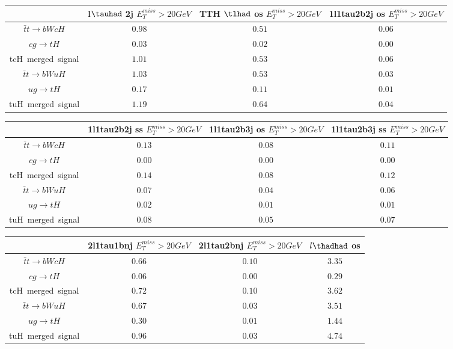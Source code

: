 \begin{tabular}{|c|c|c|c|} \hline
 & l$\tauhad$ 2j  $E_T^{miss}>20GeV$ & TTH $\tlhad$ os  $E_T^{miss}>20GeV$ & 1l1tau2b2j os  $E_T^{miss}>20GeV$\\\hline
$\bar{t}t\to bWcH$ & $0.98$ & $0.51$ & $0.06$\\\hline
$cg\to tH$ & $0.03$ & $0.02$ & $0.00$\\\hline
tcH~merged~signal & $1.01$ & $0.53$ & $0.06$\\\hline
$\bar{t}t\to bWuH$ & $1.03$ & $0.53$ & $0.03$\\\hline
$ug\to tH$ & $0.17$ & $0.11$ & $0.01$\\\hline
tuH~merged~signal & $1.19$ & $0.64$ & $0.04$\\\hline
\end{tabular}
\begin{tabular}{|c|c|c|c|} \hline
 & 1l1tau2b2j ss  $E_T^{miss}>20GeV$ & 1l1tau2b3j os  $E_T^{miss}>20GeV$ & 1l1tau2b3j ss  $E_T^{miss}>20GeV$\\\hline
$\bar{t}t\to bWcH$ & $0.13$ & $0.08$ & $0.11$\\\hline
$cg\to tH$ & $0.00$ & $0.00$ & $0.00$\\\hline
tcH~merged~signal & $0.14$ & $0.08$ & $0.12$\\\hline
$\bar{t}t\to bWuH$ & $0.07$ & $0.04$ & $0.06$\\\hline
$ug\to tH$ & $0.02$ & $0.01$ & $0.01$\\\hline
tuH~merged~signal & $0.08$ & $0.05$ & $0.07$\\\hline
\end{tabular}
\begin{tabular}{|c|c|c|c|} \hline
 & 2l1tau1bnj  $E_T^{miss}>20GeV$ & 2l1tau2bnj  $E_T^{miss}>20GeV$ & $l\thadhad$ os\\\hline
$\bar{t}t\to bWcH$ & $0.66$ & $0.10$ & $3.35$\\\hline
$cg\to tH$ & $0.06$ & $0.00$ & $0.29$\\\hline
tcH~merged~signal & $0.72$ & $0.10$ & $3.62$\\\hline
$\bar{t}t\to bWuH$ & $0.67$ & $0.03$ & $3.51$\\\hline
$ug\to tH$ & $0.30$ & $0.01$ & $1.44$\\\hline
tuH~merged~signal & $0.96$ & $0.03$ & $4.74$\\\hline
\end{tabular}
